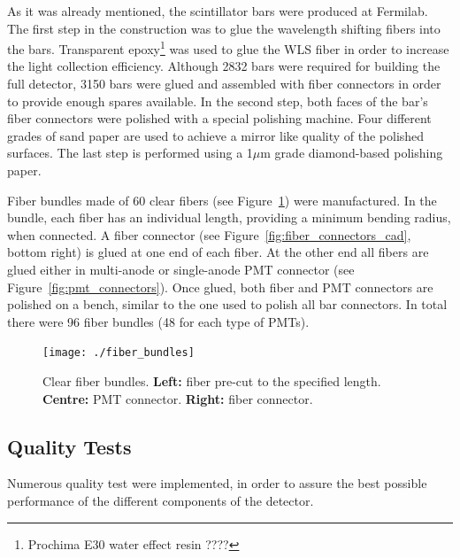 \documentclass[a4paper,11pt]{article}
\begin{document}
As it was already mentioned, the scintillator bars were produced at Fermilab. The first step in the construction was to glue the wavelength shifting fibers
into the bars. Transparent epoxy\footnote{Prochima E30 water effect resin ????} was used to glue the WLS fiber in order to increase the light collection
efficiency. Although 2832 bars were required for building the full detector, 3150 bars were glued and assembled with fiber connectors in
order to provide enough spares available. In the second step, both faces of the bar's fiber connectors were polished with a special polishing machine. Four
different grades of sand paper are used to achieve a mirror like quality of the polished surfaces. The last step is performed using a 1$\mu$m grade
diamond-based polishing paper.

Fiber bundles made of 60 clear fibers (see Figure~\ref{fig:fiber_bundles}) were manufactured. In the bundle, each fiber has an individual length, providing
a minimum bending radius, when connected. A fiber connector (see Figure~\ref{fig:fiber_connectors_cad}, bottom right) is glued at one end of each fiber. At
the other end all fibers are glued either in multi-anode or single-anode PMT connector (see Figure~\ref{fig:pmt_connectors}). Once glued, both fiber and PMT
connectors are polished on a bench, similar to the one used to polish all bar connectors. In total there were 96 fiber bundles (48 for each type of PMTs).

\begin{figure}[htp!]
 \centering
 \texttt{[image: ./fiber\_bundles]}
 \caption[Clear fiber bundles]{Clear fiber bundles. {\bf Left:} fiber pre-cut to the specified length. {\bf Centre:} PMT connector. {\bf Right:} fiber connector.}
 \label{fig:fiber_bundles}
\end{figure}

\subsection{Quality Tests}\label{construction:subsec:quality_tests}

Numerous quality test were implemented, in order to assure the best possible performance of the different components of the detector. 
\end{document}

